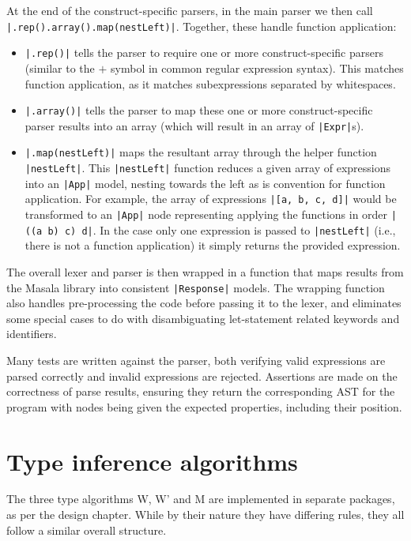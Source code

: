 \documentclass[a4paper,fleqn,twoside,12pt]{report}
\begin{document}
At the end of the construct-specific parsers, in the main parser we then call \texttt{|.rep().array().map(nestLeft)|}. Together, these handle function application:
\begin{itemize}
  \item \texttt{|.rep()|} tells the parser to require one or more construct-specific parsers (similar to the $+$ symbol in common regular expression syntax). This matches function application, as it matches subexpressions separated by whitespaces.
  \item \texttt{|.array()|} tells the parser to map these one or more construct-specific parser results into an array (which will result in an array of \texttt{|Expr|}s).
  \item \texttt{|.map(nestLeft)|} maps the resultant array through the helper function \texttt{|nestLeft|}. This \texttt{|nestLeft|} function reduces a given array of expressions into an \texttt{|App|} model, nesting towards the left as is convention for function application. For example, the array of expressions \texttt{|[a, b, c, d]|} would be transformed to an \texttt{|App|} node representing applying the functions in order \texttt{|((a b) c) d|}. In the case only one expression is passed to \texttt{|nestLeft|} (i.e., there is not a function application) it simply returns the provided expression.
\end{itemize}

The overall lexer and parser is then wrapped in a function that maps results from the Masala library into consistent \texttt{|Response|} models. The wrapping function also handles pre-processing the code before passing it to the lexer, and eliminates some special cases to do with disambiguating let-statement related keywords and identifiers.

Many tests are written against the parser, both verifying valid expressions are parsed correctly and invalid expressions are rejected. Assertions are made on the correctness of parse results, ensuring they return the corresponding AST for the program with nodes being given the expected properties, including their position.
\section{Type inference algorithms}\label{id:h.flyu66glh76t}
The three type algorithms W, W’ and M are implemented in separate packages, as per the design chapter. While by their nature they have differing rules, they all follow a similar overall structure.
\end{document}
